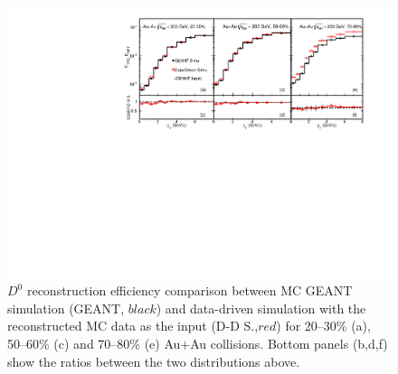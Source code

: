 \documentclass[%
 reprint,	
showpacs,
 amsmath,amssymb,
 aps,
 prc,
]{revtex4-1}
\begin{document}
\begin{figure}
\centering
\includegraphics[width=1.05\textwidth]{fig/Mcd0Eff_20_80.pdf}
  \caption{$D^{0}$ reconstruction efficiency comparison between MC GEANT simulation (GEANT, $black$) and  data-driven simulation with the reconstructed MC data as the input (D-D S.,$red$) for 20--30\% (a), 50--60\% (c) and 70--80\% (e) Au+Au collisions. Bottom panels (b,d,f) show the ratios between the two distributions above.}
\label{fig:Mcd0Eff_20_80} 
\end{figure}

\end{document}
